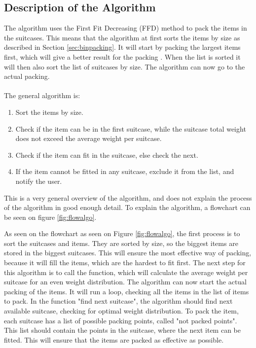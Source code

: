 \subsection{Description of the Algorithm}
The algorithm uses the First Fit Decreasing (FFD) method to pack the items in the suitcases. This means that the algorithm at first sorts the items by size as described in Section \ref{sec:binpacking}. It will start by packing the largest items first, which will give a better result for the packing \citep{binpackingsource}. When the list is sorted it will then also sort the list of suitcases by size. The algorithm can now go to the actual packing.\\
\\
The general algorithm is:
\begin{enumerate}
	\item Sort the items by size.
	\item Check if the item can be in the first suitcase, while the suitcase total weight does not exceed the average weight per suitcase.
	\item Check if the item can fit in the suitcase, else check the next.
	\item If the item cannot be fitted in any suitcase, exclude it from the list, and notify the user.
\end{enumerate}

This is a very general overview of the algorithm, and does not explain the process of the algorithm in good enough detail. To explain the algorithm, a flowchart can be seen on figure \ref{fig:flowalgo}.


As seen on the flowchart as seen on Figure \ref{fig:flowalgo}, the first process is to sort the suitcases and items. They are sorted by size, so the biggest items are stored in the biggest suitcases. This will ensure the most effective way of packing, because it will fill the items, which are the hardest to fit first. The next step for this algorithm is to call the function, which will calculate the average weight per suitcase for an even weight distribution. The algorithm can now start the actual packing of the items.
It will run a loop, checking all the items in the list of items to pack. In the function "find next suitcase", the algorithm should find next available suitcase, checking for optimal weight distribution. To pack the item, each suitcase has a list of possible packing points, called "not packed points". This list should contain the points in the suitcase, where the next item can be fitted. This will ensure that the items are packed as effective as possible.

